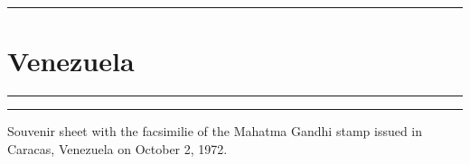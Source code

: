 \documentclass[a4paper]{article}
\begin{document}
  \hrule
\section*{Venezuela}
\vspace{8pt}
\hrule
\vspace{17cm}
\begin{center}
\begin{minipage}{10cm}
  \hrule \vspace{12pt} Souvenir sheet with the facsimilie of the Mahatma Gandhi stamp issued in Caracas, Venezuela on
  October 2, 1972.
\end{minipage}
\end{center}

\end{document}

